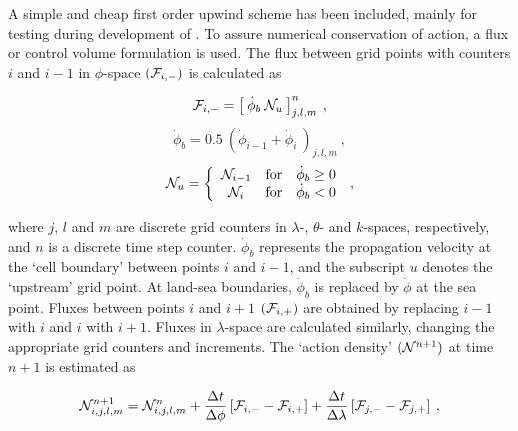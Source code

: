 
\vspace{\baselineskip} 


\noindent
A simple and cheap first order upwind scheme has been included, mainly for
testing during development of \ws. To assure numerical conservation of action,
a flux or control volume formulation is used. The flux between grid points
with counters $i$ and $i-1$ in $\phi$-space $({\cal F}_{i,-})$ is calculated as


\begin{equation}
{\cal F}_{i,-} = \left [ \: \dot{\phi}_b \: {\cal N}_u \: \right ]^n_{j,l,m}
\: , \label{eq:1up_xy_1} \end{equation} \begin{equation}
\dot{\phi}_b = 0.5 \: \left ( \dot{\phi}_{i-1} + \dot{\phi}_i 
\: \right )_{j,l,m} \: , \label{eq:1up_xy_2}
\end{equation} \begin{equation}
{\cal N}_u = \left \{ \begin{array}{ccc}
{\cal N}_{i-1} & \mbox{for} & \dot{\phi}_b \geq 0 \\
{\cal N}_i     & \mbox{for} & \dot{\phi}_b   <  0
\end{array} \right . \: , \label{eq:1up_xy_3}
\end{equation}

\noindent
where $j$, $l$ and $m$ are discrete grid counters in $\lambda$-, $\theta$- and
$k$-spaces, respectively, and $n$ is a discrete time step
counter. $\dot{\phi}_b$ represents the propagation velocity at the `cell
boundary' between points $i$ and $i-1$, and the subscript $u$ denotes the
`upstream' grid point. At land-sea boundaries, $\dot{\phi}_b$ is replaced by
$\dot{\phi}$ at the sea point. Fluxes between points $i$ and $i+1$
$({\cal F}_{i,+})$ are obtained by replacing $i-1$ with $i$ and $i$ with
$i+1$. Fluxes in $\lambda$-space are calculated similarly, changing the
appropriate grid counters and increments.  The `action density' $({\cal N}^{n+1})$
at time $n+1$ is estimated as


\begin{equation}
{\cal N}_{i,j,l,m}^{n+1} = {\cal N}_{i,j,l,m}^n
  + \frac{\Delta t}{\Delta \phi   } \left [ {\cal F}_{i,-} - {\cal F}_{i,+} \right ]
  + \frac{\Delta t}{\Delta \lambda} \left [ {\cal F}_{j,-} - {\cal F}_{j,+} \right ]
\: , \label{eq:1up_xy_tot}
\end{equation}

